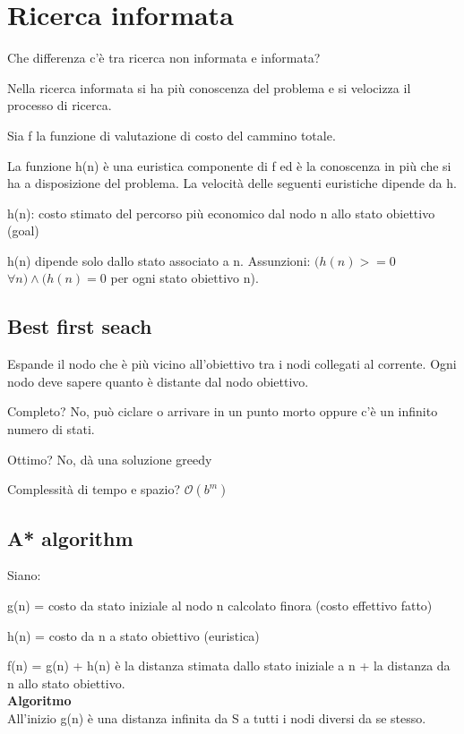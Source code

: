 \newpage

\section{Ricerca informata}

Che differenza c'è tra ricerca non informata e informata?

Nella ricerca informata si ha più conoscenza del problema e si
velocizza il processo di ricerca.

Sia f la funzione di valutazione di costo del cammino totale.

La funzione h(n) è una euristica componente di f ed è la
conoscenza in più che si ha a disposizione del problema. La
velocità delle seguenti euristiche dipende da h.

h(n): costo stimato del percorso più economico dal nodo n allo stato
obiettivo (goal)

h(n) dipende solo dallo stato associato a n.
Assunzioni: $(h(n) >= 0$ $\forall n) \land (h(n) = 0$ per ogni stato
obiettivo n).

\subsection{Best first seach}
Espande il nodo che è più vicino all'obiettivo tra i nodi collegati al corrente.
Ogni nodo deve sapere quanto è distante dal nodo obiettivo.

Completo? No, può ciclare o arrivare in un punto morto oppure c'è un infinito
numero di stati.

Ottimo? No, dà una soluzione greedy

Complessità di tempo e spazio? $\mathcal{O}(b^m)$

\subsection{A* algorithm}

Siano:

g(n) = costo da stato iniziale al nodo n calcolato finora (costo effettivo fatto)

h(n) = costo da n a stato obiettivo (euristica)

f(n) = g(n) + h(n) è la distanza stimata dallo stato iniziale a n + la distanza
da n allo stato obiettivo.\\

\textbf{Algoritmo}\\

All'inizio g(n) è una distanza infinita da S a tutti i nodi diversi da se
stesso.

